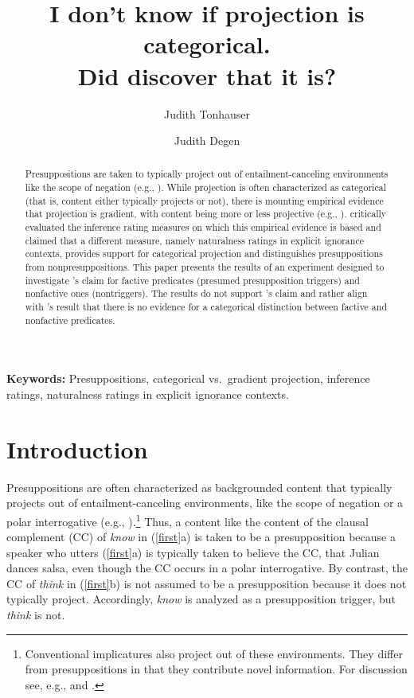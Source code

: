 \documentclass[11pt,fleqn]{article}
\title{I don't know if projection is categorical. \\ Did \citealt{mandelkern-etal2020} discover that it is?}
\author[$\circ$]{Judith Tonhauser}
\author[$\bullet$]{Judith Degen}
\affil[$\circ$]{University of Stuttgart, Department of Linguistics, Stuttgart, Germany, judith.tonhauser@ling.uni-stuttgart.de (corresponding author)}
\affil[$\bullet$]{Stanford University, Department of Linguistics, Stanford, USA, jdegen@stanford.edu}
\newcommand{\6}{\mbox{$[\hspace*{-.6mm}[$}}
\newcommand{\9}{\mbox{$]\hspace*{-.6mm}]$}}
\newcommand{\citepos}[1]{\citeauthor{#1}'s \citeyear{#1}}
\begin{document}
\maketitle

\begin{abstract}

Presuppositions are taken to typically project out of entailment-canceling environments like the scope of negation (e.g., \citealt{ccmg90}). While projection is often characterized as categorical (that is, content either typically projects or not), there is mounting empirical evidence that projection is gradient, with content being more or less projective (e.g., \citealt{karttunen71b,xue-onea11,demarneffe-etal-sub23,tbd-variability,degen-tonhauser-language}). \citealt{mandelkern-etal2020} critically evaluated the inference rating measures on which this empirical evidence is based and claimed that a different measure, namely naturalness ratings in explicit ignorance contexts, provides support for categorical projection and distinguishes presuppositions from nonpresuppositions. This paper presents the results of an experiment designed to investigate \citepos{mandelkern-etal2020} claim for factive predicates (presumed presupposition triggers) and nonfactive ones (nontriggers). The results do not support \citepos{mandelkern-etal2020} claim and rather align with \citepos{degen-tonhauser-language} result that there is no evidence for a categorical distinction between factive and nonfactive predicates. 

\end{abstract}

\bigskip

\noindent
{\bf Keywords:} Presuppositions, categorical vs.\ gradient projection, inference ratings, naturalness ratings in explicit ignorance contexts. 


\section{Introduction}\label{s1}

Presuppositions are often characterized as backgrounded content that typically projects out of entailment-canceling environments, like the scope of negation or a polar interrogative (e.g., \citealt{ccmg90}).\footnote{Conventional implicatures also project out of these environments. They differ from presuppositions in that they contribute novel information. For discussion see, e.g., \citealt{ccmg90} and \citealt{potts05}.} Thus, a content like the content of the clausal complement (CC) of {\em know} in (\ref{first}a) is taken to be a presupposition because a speaker who utters (\ref{first}a) is typically taken to believe the CC, that Julian dances salsa, even though the CC occurs in a polar interrogative. By contrast, the CC of {\em think} in (\ref{first}b) is not assumed to be a presupposition because it does not typically project. Accordingly, {\em know} is analyzed as a presupposition trigger, but {\em think} is not.
\end{document}
